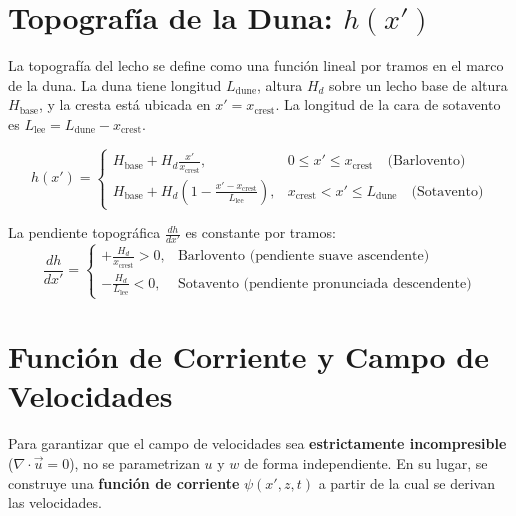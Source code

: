 \documentclass[11pt,a4paper]{article}
\begin{document}
\section{Topografía de la Duna: $h(x')$}
La topografía del lecho se define como una función lineal por tramos en el marco de la duna. La duna tiene longitud $L_{\text{dune}}$, altura $H_d$ sobre un lecho base de altura $H_{\text{base}}$, y la cresta está ubicada en $x' = x_{\text{crest}}$. La longitud de la cara de sotavento es $L_{\text{lee}} = L_{\text{dune}} - x_{\text{crest}}$.

\begin{equation}
    h(x') = \begin{cases}
        H_{\text{base}} + H_d \displaystyle\frac{x'}{x_{\text{crest}}}, & 0 \le x' \le x_{\text{crest}} \quad \text{(Barlovento)} \\[8pt]
        H_{\text{base}} + H_d \left( 1 - \displaystyle\frac{x' - x_{\text{crest}}}{L_{\text{lee}}} \right), & x_{\text{crest}} < x' \le L_{\text{dune}} \quad \text{(Sotavento)}
    \end{cases}
\end{equation}

La pendiente topográfica $\frac{dh}{dx'}$ es constante por tramos:
\begin{equation}
    \frac{dh}{dx'} = \begin{cases}
        +\displaystyle\frac{H_d}{x_{\text{crest}}} > 0, & \text{Barlovento (pendiente suave ascendente)} \\[8pt]
        -\displaystyle\frac{H_d}{L_{\text{lee}}} < 0, & \text{Sotavento (pendiente pronunciada descendente)}
    \end{cases}
\end{equation}

\section{Función de Corriente y Campo de Velocidades}
Para garantizar que el campo de velocidades sea \textbf{estrictamente incompresible} ($\nabla \cdot \vec{u} = 0$), no se parametrizan $u$ y $w$ de forma independiente. En su lugar, se construye una \textbf{función de corriente} $\psi(x', z, t)$ a partir de la cual se derivan las velocidades.
\end{document}
